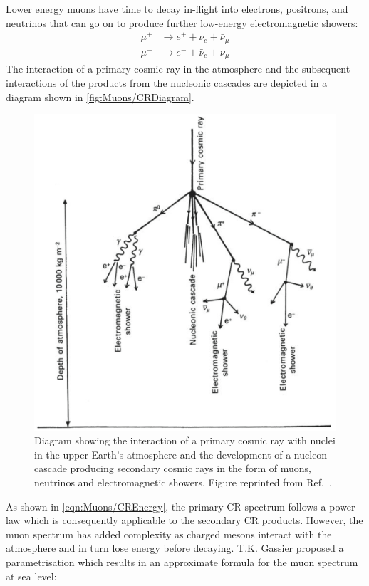 Lower energy muons have time to decay in-flight into electrons, positrons, and neutrinos that can go on to produce further low-energy electromagnetic showers:
\begin{equation}
\begin{split}    
    \mu^+&\rightarrow e^++\nu_e+\bar\nu_\mu \\
    \mu^-&\rightarrow e^-+\bar\nu_e+\nu_\mu
\end{split}
\end{equation}
The interaction of a primary cosmic ray in the atmosphere and the subsequent interactions of the products from the nucleonic cascades are depicted in a diagram shown in \autoref{fig:Muons/CRDiagram}.
\begin{figure}[ht!]
    \centering
    \includegraphics[width=0.8\linewidth]{figures/Muons/MuonShower.png}
    \caption{Diagram showing the interaction of a primary cosmic ray with nuclei in the upper Earth's atmosphere and the development of a nucleon cascade producing secondary cosmic rays in the form of muons, neutrinos and electromagnetic showers. Figure reprinted from Ref.~\cite{Longair_2011}.}
    \label{fig:Muons/CRDiagram}
\end{figure}
As shown in \autoref{eqn:Muons/CREnergy}, the primary CR spectrum follows a power-law which is consequently applicable to the secondary CR products. However, the muon spectrum has added complexity as charged mesons interact with the atmosphere and in turn lose energy before decaying. T.K. Gassier proposed a parametrisation \cite{Gaisser_Engel_Resconi_2016} which results in an approximate formula for the muon spectrum at sea level:
